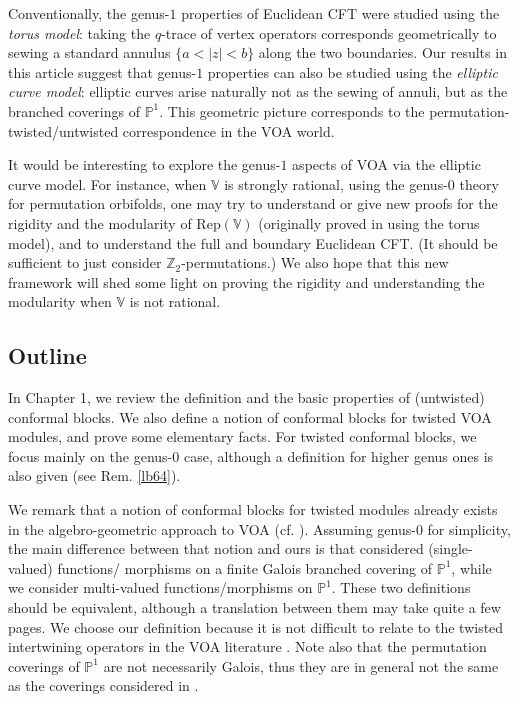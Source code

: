 \documentclass[12pt,a4paper,notitlepage]{article}
\theoremstyle{definition}
\theoremstyle{plain}
\newcommand{\Rep}{\mathrm{Rep}}
\newcommand{\Vbb}{\mathbb V}
\newcommand{\Zbb}{\mathbb Z}
\newcommand{\Pbb}{\mathbb P}
\numberwithin{equation}{subsection}
\begin{document}
Conventionally, the genus-$1$ properties of Euclidean  CFT were studied using the \emph{torus model}: taking the $q$-trace of vertex operators corresponds geometrically to sewing a standard annulus $\{a<|z|<b\}$ along the two boundaries. Our results in this article suggest that  genus-$1$ properties can also be studied using the \emph{elliptic curve model}: elliptic curves arise naturally not as the sewing of annuli, but as the branched coverings of $\Pbb^1$. This geometric picture corresponds to  the permutation-twisted/untwisted correspondence in the VOA world. 

It would be interesting to explore the genus-$1$ aspects of VOA via the elliptic curve model. For instance, when $\Vbb$ is strongly rational, using the genus-$0$ theory for permutation orbifolds, one may try to understand or give new proofs for the rigidity and the modularity of $\Rep(\Vbb)$ (originally proved in \cite{Hua08a,Hua08b} using the torus model), and to understand the full and boundary Euclidean CFT. (It should be sufficient to just consider $\Zbb_2$-permutations.) We also hope that this new framework will shed some light on proving the rigidity and understanding the modularity when $\Vbb$ is not rational.










\subsection{Outline}


In Chapter 1, we review the definition and the basic properties of (untwisted) conformal blocks. We also define a notion of conformal blocks for twisted VOA modules, and prove some elementary facts. For twisted conformal blocks, we focus mainly on the genus-$0$ case, although a definition for higher genus ones is also given (see Rem. \ref{lb64}).

We remark that a notion of conformal blocks for twisted modules already exists in the algebro-geometric approach to VOA  (cf. \cite{FS04}). Assuming genus-$0$ for simplicity, the main difference between that notion and ours is  that \cite{FS04} considered (single-valued) functions/ morphisms on a finite Galois branched covering of $\Pbb^1$, while we consider multi-valued functions/morphisms on $\Pbb^1$. These two definitions should be equivalent, although a translation between them may take quite a few pages. We choose our definition  because it is not difficult to relate to the twisted intertwining operators in the VOA literature \cite{Hua18,McR21}. Note also that the permutation coverings of $\Pbb^1$ are not necessarily Galois, thus they are in general not the same as the coverings considered in \cite{FS04}.
\end{document}
